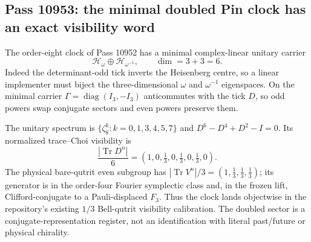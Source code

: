 \subsection{Pass 10953: the minimal doubled Pin clock has an exact visibility word}

The order-eight clock of Pass 10952 has a minimal complex-linear unitary
carrier
\[
 \mathcal H_\omega\oplus\mathcal H_{\omega^{-1}},
 \qquad \dim=3+3=6.
\]
Indeed the determinant-odd tick inverts the Heisenberg centre, so a linear
implementer must biject the three-dimensional $\omega$ and
$\omega^{-1}$ eigenspaces.  On the minimal carrier
$\Gamma=\operatorname{diag}(I_3,-I_3)$ anticommutes with the tick $D$,
so odd powers swap conjugate sectors and even powers preserve them.

The unitary spectrum is
$\{\zeta_8^k:k=0,1,3,4,5,7\}$ and
$D^6-D^4+D^2-I=0$. Its normalized trace--Choi visibility is
\[
 \frac{|\operatorname{Tr}D^n|}{6}
   =(1,0,\tfrac13,0,\tfrac13,0,\tfrac13,0).
\]
The physical bare-qutrit even subgroup has
$|\operatorname{Tr}V^n|/3=(1,\tfrac13,\tfrac13,\tfrac13)$; its
generator is in the order-four Fourier symplectic class and, in the frozen
lift, Clifford-conjugate to a Pauli-displaced $F_3$.  Thus the clock lands
objectwise in the repository's existing $1/3$ Bell-qutrit visibility
calibration. The doubled sector is a conjugate-representation register, not
an identification with literal past/future or physical chirality.
